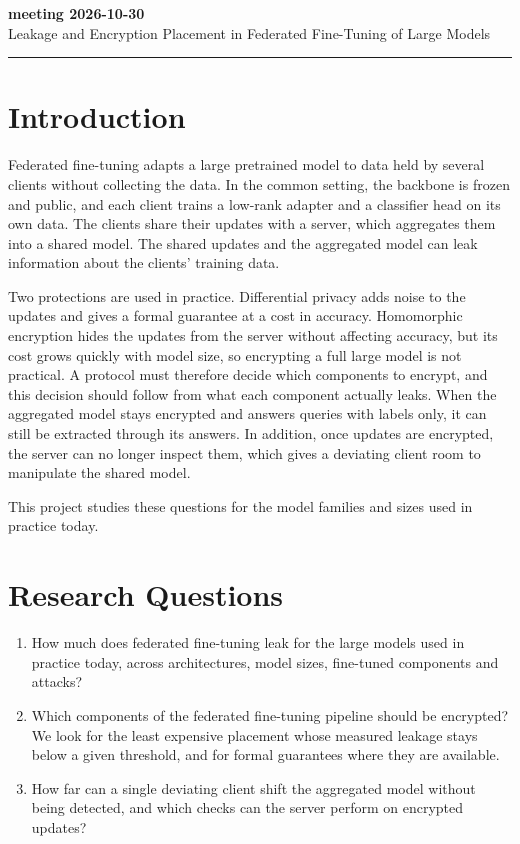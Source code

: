 \documentclass[10pt,a4paper]{article}
\newcommand{\redline}{\textcolor{kred}{\rule{\textwidth}{1pt}}}
\begin{document}
\thispagestyle{fancy}

{\LARGE\bfseries\textcolor{kred}{meeting 2026-10-30}}\\[0.3em]
{\large Leakage and Encryption Placement in Federated Fine-Tuning of Large Models}\\[0.2em]
\redline

\section{Introduction}

Federated fine-tuning adapts a large pretrained model to data held by several clients without collecting the data. In the common setting, the backbone is frozen and public, and each client trains a low-rank adapter and a classifier head on its own data. The clients share their updates with a server, which aggregates them into a shared model. The shared updates and the aggregated model can leak information about the clients' training data.

Two protections are used in practice. Differential privacy adds noise to the updates and gives a formal guarantee at a cost in accuracy. Homomorphic encryption hides the updates from the server without affecting accuracy, but its cost grows quickly with model size, so encrypting a full large model is not practical. A protocol must therefore decide which components to encrypt, and this decision should follow from what each component actually leaks. When the aggregated model stays encrypted and answers queries with labels only, it can still be extracted through its answers. In addition, once updates are encrypted, the server can no longer inspect them, which gives a deviating client room to manipulate the shared model.

This project studies these questions for the model families and sizes used in practice today.

\section{Research Questions}

\begin{enumerate}
\item How much does federated fine-tuning leak for the large models used in practice today, across architectures, model sizes, fine-tuned components and attacks?
\item Which components of the federated fine-tuning pipeline should be encrypted? We look for the least expensive placement whose measured leakage stays below a given threshold, and for formal guarantees where they are available.
\item How far can a single deviating client shift the aggregated model without being detected, and which checks can the server perform on encrypted updates?
\end{enumerate}
\end{document}
